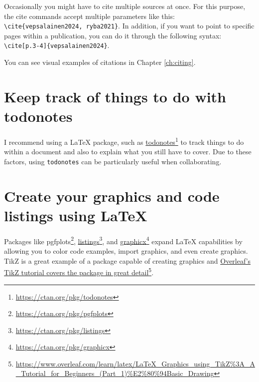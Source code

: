 Occasionally you might have to cite multiple sources at once.
For this purpose, the cite commands accept multiple parameters like this: \texttt{\textbackslash cite\{vepsalainen2024, ryba2021\}}. In addition, if you want to point to specific pages within a publication, you can do it through the following syntax: \texttt{\textbackslash cite[p.3-4]\{vepsalainen2024\}}.

You can see visual examples of citations in Chapter \ref{ch:citing}.

\section{Keep track of things to do with todonotes}

I recommend using a LaTeX package, such as \href{https://ctan.org/pkg/todonotes}{todonotes}\footnote{\url{https://ctan.org/pkg/todonotes}} to track things to do within a document and also to explain what you still have to cover. Due to these factors, using \texttt{todonotes} can be particularly useful when collaborating. %



\section{Create your graphics and code listings using LaTeX}

Packages like {pgfplots}\footnote{\url{https://ctan.org/pkg/pgfplots}}, \href{https://ctan.org/pkg/listings}{listings}\footnote{\url{https://ctan.org/pkg/listings}}, and \href{https://ctan.org/pkg/graphicx}{graphicx}\footnote{\url{https://ctan.org/pkg/graphicx}} expand LaTeX capabilities by allowing you to color code examples, import graphics, and even create graphics.
TikZ is a great example of a package capable of creating graphics and \href{https://www.overleaf.com/learn/latex/LaTeX_Graphics_using_TikZ\%3A_A_Tutorial_for_Beginners_(Part_1)\%E2\%80\%94Basic_Drawing}{Overleaf's TikZ tutorial covers the package in great detail}\footnote{\url{https://www.overleaf.com/learn/latex/LaTeX_Graphics_using_TikZ\%3A_A_Tutorial_for_Beginners_(Part_1)\%E2\%80\%94Basic_Drawing}}.


